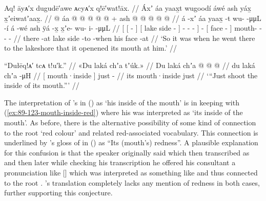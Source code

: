 \ex\label{ex:89-130-when-lakeshore-open-mouth}%
%
\begingl
	\glpreamble	Aq! āyᴀ′x dugudē′awe ᴀcyᴀ′x q!ē′wat!āx. //
	\glpreamble	Áxʼ áa yaax̱t wugoodí áwé ash yáx̱ x̱ʼeiwatʼaax̱. //
	\gla	{} {}  @ {} {}
			{} áa  @ {} {} 
			 @ {} @ {} @ {} {} 
		 @ {} +
		{} ash  @ {} {} 
		 @ {} @ {} @ {} @ {} //
	\glb	{} {} á -xʼ {}
			{} áa yaax̱ -t {}
			wu-  -μμL -í {}
		á -wé
		{} ash ÿá -x̱ {}
		x̱ʼe- wu- i-  -μμL //
	\glc	{}[ {}[  - {}]
			{}[ lake side - {}]
			-  - - {}]
		 -
		{}[  face - {}]
		mouth- - -  - //
	\gld	{} {} there -at {}
			{} lake side -to {}
			 {} {} -when {}
		 {}
		{} his face -at {}
		 {} {} {} {} //
	\glft	‘So it was when he went there to the lakeshore that it openened its mouth at him.’
		//
\endgl
\xe

\ex\label{ex:89-131-shoot-its-mouth}%
%
\begingl
	\glpreamble	“Dułēq!ᴀ′ tcᴀ t!u′k.” //
	\glpreamble	«\!Du laká chʼa tʼúk.\!» //
	\gla	{} Du laká {}
		chʼa  @ {} @ {} @ {} //
	\glb	{} du laká {}
		chʼa {} {}  -μH //
	\glc	{}[  mouth·inside {}]
		just \· \·  - //
	\gld	{} its mouth·inside {}
		just  {} {} {} //
	\glft	‘“Just shoot the inside of its mouth.”’
		//
\endgl
\xe

The interpretation of \citeauthor{swanton:1909}’s  in (\lastx) as  ‘his inside of the mouth’ is in keeping with (\ref{ex:89-123-mouth-inside-red}) where his  was interpreted as  ‘its inside of the mouth’.
As before, there is the alternative possibility of some kind of connection to the root  ‘red colour’ and related red-associated vocabulary.
This connection is underlined by \citeauthor{swanton:1909}’s gloss of  in (\lastx) as “Its (mouth’s) redness”.
A plausible explanation for this confusion is that the speaker originally said  which \citeauthor{swanton:1909} then transcribed as  and then later while checking his transcription he offered his consultant a pronunciation like [] which was interpreted as something like  and thus connected to the root .
\citeauthor{swanton:1909}’s translation completely lacks any mention of redness in both cases, further supporting this conjecture.


